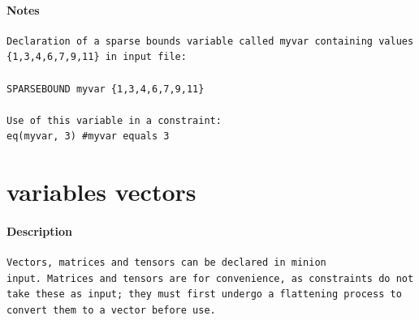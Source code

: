 \documentclass[oneside]{book}
\begin{document}
\paragraph{Notes}
{\footnotesize
\begin{verbatim}
Declaration of a sparse bounds variable called myvar containing values
{1,3,4,6,7,9,11} in input file:

SPARSEBOUND myvar {1,3,4,6,7,9,11}

Use of this variable in a constraint:
eq(myvar, 3) #myvar equals 3
\end{verbatim}
}
\section{variables vectors}
\paragraph{Description}
{\footnotesize
\begin{verbatim}
Vectors, matrices and tensors can be declared in minion
input. Matrices and tensors are for convenience, as constraints do not
take these as input; they must first undergo a flattening process to
convert them to a vector before use.
\end{verbatim}
}
\end{document}
